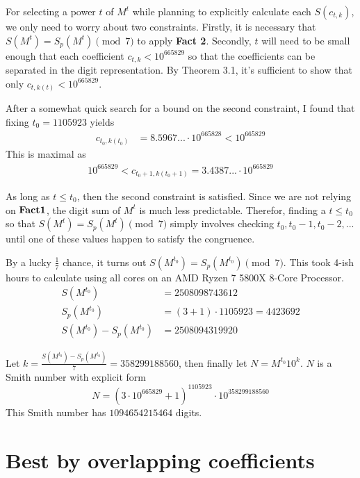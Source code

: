 \documentclass{amsart}
\newcommand{\ME}{{665829}}
\numberwithin{equation}{section}
\theoremstyle{plain} %
\theoremstyle{definition}
\theoremstyle{remark}
\begin{document}
For selecting a power $t$ of $M^t$ while planning to explicitly calculate each $S(c_{t,k})$, we only need to worry about two constraints. Firstly, it is necessary that $S(M^t) = S_p(M^t) \pmod{7}$ to apply {\bf Fact 2}. Secondly, $t$ will need to be small enough that each coefficient $c_{t,k} < 10^\ME$ so that the coefficients can be separated in the digit representation. By Theorem 3.1, it's sufficient to show that only $c_{t,k(t)} < 10^\ME$.

After a somewhat quick search for a bound on the second constraint, I found that fixing $t_0 = 1105923$ yields
\begin{align*}
c_{t_0,k(t_0)} &=          8.5967... \cdot 10 ^{665828}  < 10^{665829}
\end{align*}
This is maximal as 
\begin{align*}
10^{665829} < c_{t_0+1,k(t_0 + 1)}  =    3.4387... \cdot 10 ^{665829}
\end{align*}

As long as $t \leq t_0$, then the second constraint is satisfied. Since we are not relying on ${\bf Fact 1}$, the digit sum of $M^t$ is much less predictable. Therefor, finding a $t \leq t_0$ so that $S(M^t) = S_p(M^t) \pmod{7}$ simply involves checking $t_0, t_0 -1 , t_0 -2,...$ until one of these values happen to satisfy the congruence.

By a lucky $\frac{1}{7}$ chance, it turns out $S(M^{t_0}) =  S_p(M^{t_0}) \pmod{7}$. This took 4-ish hours to calculate using all cores on an AMD Ryzen 7 5800X 8-Core Processor.
\begin{align*}
S(M^{t_0})&=  2508098743612       \\
S_p(M^{t_0}) &= (3+ 1) \cdot  1105923 =  4423692   \\
S(M^{t_0}) -  S_p(M^{t_0}) &= 2508094319920
\end{align*}

Let $k = \frac{S(M^{t_0}) -  S_p(M^{t_0}) }{7} = 358299188560$, then finally let $N = M^{t_0} 10^k$. $N$ is a Smith number with explicit form
$$N = (3\cdot 10^\ME + 1)^{1105923} \cdot 10^{358299188560}$$
This Smith number has $\num{1094654215464}$ digits.
\,\\ \section{Best by overlapping coefficients}

\end{document}
